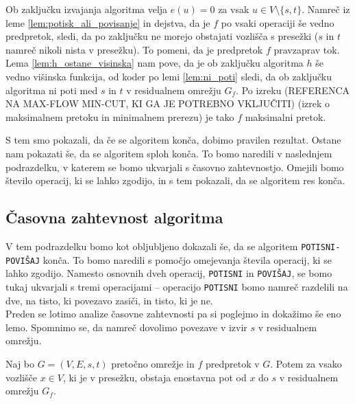 \documentclass[mat1]{fmfdelo}
\begin{document}
\begin{dokaz}
Ob zaključku izvajanja algoritma velja $e(u) = 0$ za vsak $u \in V\setminus \{s,t\}$. Namreč iz leme \ref{lem:potisk_ali_povisanje} in dejstva, da je $f$ po vsaki operaciji še vedno predpretok, sledi, da po zaključku ne morejo obstajati vozlišča s presežki ($s$ in $t$ namreč nikoli nista v presežku). To pomeni, da je predpretok $f$ pravzaprav tok. Lema \ref{lem:h_ostane_visinska} nam pove, da je ob zaključku algoritma $h$ še vedno višinska funkcija, od koder po lemi \ref{lem:ni_poti} sledi, da ob zaključku algoritma ni poti med $s$ in $t$ v residualnem omrežju $G_f$. Po izreku (REFERENCA NA MAX-FLOW MIN-CUT, KI GA JE POTREBNO VKLJUČITI) (izrek o maksimalnem pretoku in minimalnem prerezu) je tako $f$ maksimalni pretok.
\end{dokaz}

S tem smo pokazali, da če se algoritem konča, dobimo pravilen rezultat. Ostane nam pokazati še, da se algoritem sploh konča. To bomo naredili v naslednjem podrazdelku, v katerem se bomo ukvarjali s časovno zahtevnostjo. Omejili bomo število operacij, ki se lahko zgodijo, in s tem pokazali, da se algoritem res konča.\\

\subsection{Časovna zahtevnost algoritma}

V tem podrazdelku bomo kot obljubljeno dokazali še, da se algoritem \texttt{POTISNI-POVIŠAJ} konča. To bomo naredili s pomočjo omejevanja števila operacij, ki se lahko zgodijo. Namesto osnovnih dveh operacij, \texttt{POTISNI} in \texttt{POVIŠAJ}, se bomo tukaj ukvarjali s tremi operacijami -- operacijo \texttt{POTISNI} bomo namreč razdelili na dve, na tisto, ki povezavo zasiči, in tisto, ki je ne.\\

Preden se lotimo analize časovne zahtevnosti pa si poglejmo in dokažimo še eno lemo. Spomnimo se, da namreč dovolimo povezave v izvir $s$ v residualnem omrežju.\\

\begin{lema}\label{lem:enostavna_pot_s}
Naj bo $G=(V,E,s,t)$ pretočno omrežje in $f$ predpretok v $G$. Potem za vsako vozlišče $x\in V$, ki je v presežku, obstaja enostavna pot od $x$ do $s$ v residualnem omrežju $G_f$.
\end{lema}
\end{document}
